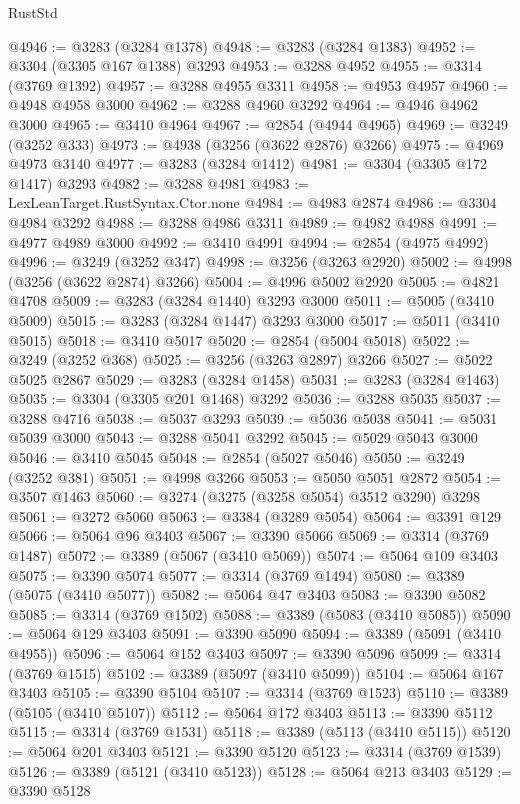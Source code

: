\begin{lexlean}{RustStd}
\begin{coremodule}
@4946 := @3283 (@3284 @1378)
@4948 := @3283 (@3284 @1383)
@4952 := @3304 (@3305 @167 @1388) @3293
@4953 := @3288 @4952
@4955 := @3314 (@3769 @1392)
@4957 := @3288 @4955 @3311
@4958 := @4953 @4957
@4960 := @4948 @4958 @3000
@4962 := @3288 @4960 @3292
@4964 := @4946 @4962 @3000
@4965 := @3410 @4964
@4967 := @2854 (@4944 @4965)
@4969 := @3249 (@3252 @333)
@4973 := @4938 (@3256 (@3622 @2876) @3266)
@4975 := @4969 @4973 @3140
@4977 := @3283 (@3284 @1412)
@4981 := @3304 (@3305 @172 @1417) @3293
@4982 := @3288 @4981
@4983 := LexLeanTarget.RustSyntax.Ctor.none
@4984 := @4983 @2874
@4986 := @3304 @4984 @3292
@4988 := @3288 @4986 @3311
@4989 := @4982 @4988
@4991 := @4977 @4989 @3000
@4992 := @3410 @4991
@4994 := @2854 (@4975 @4992)
@4996 := @3249 (@3252 @347)
@4998 := @3256 (@3263 @2920)
@5002 := @4998 (@3256 (@3622 @2874) @3266)
@5004 := @4996 @5002 @2920
@5005 := @4821 @4708
@5009 := @3283 (@3284 @1440) @3293 @3000
@5011 := @5005 (@3410 @5009)
@5015 := @3283 (@3284 @1447) @3293 @3000
@5017 := @5011 (@3410 @5015)
@5018 := @3410 @5017
@5020 := @2854 (@5004 @5018)
@5022 := @3249 (@3252 @368)
@5025 := @3256 (@3263 @2897) @3266
@5027 := @5022 @5025 @2867
@5029 := @3283 (@3284 @1458)
@5031 := @3283 (@3284 @1463)
@5035 := @3304 (@3305 @201 @1468) @3292
@5036 := @3288 @5035
@5037 := @3288 @4716
@5038 := @5037 @3293
@5039 := @5036 @5038
@5041 := @5031 @5039 @3000
@5043 := @3288 @5041 @3292
@5045 := @5029 @5043 @3000
@5046 := @3410 @5045
@5048 := @2854 (@5027 @5046)
@5050 := @3249 (@3252 @381)
@5051 := @4998 @3266
@5053 := @5050 @5051 @2872
@5054 := @3507 @1463
@5060 := @3274 (@3275 (@3258 @5054) @3512 @3290) @3298
@5061 := @3272 @5060
@5063 := @3384 (@3289 @5054)
@5064 := @3391 @129
@5066 := @5064 @96 @3403
@5067 := @3390 @5066
@5069 := @3314 (@3769 @1487)
@5072 := @3389 (@5067 (@3410 @5069))
@5074 := @5064 @109 @3403
@5075 := @3390 @5074
@5077 := @3314 (@3769 @1494)
@5080 := @3389 (@5075 (@3410 @5077))
@5082 := @5064 @47 @3403
@5083 := @3390 @5082
@5085 := @3314 (@3769 @1502)
@5088 := @3389 (@5083 (@3410 @5085))
@5090 := @5064 @129 @3403
@5091 := @3390 @5090
@5094 := @3389 (@5091 (@3410 @4955))
@5096 := @5064 @152 @3403
@5097 := @3390 @5096
@5099 := @3314 (@3769 @1515)
@5102 := @3389 (@5097 (@3410 @5099))
@5104 := @5064 @167 @3403
@5105 := @3390 @5104
@5107 := @3314 (@3769 @1523)
@5110 := @3389 (@5105 (@3410 @5107))
@5112 := @5064 @172 @3403
@5113 := @3390 @5112
@5115 := @3314 (@3769 @1531)
@5118 := @3389 (@5113 (@3410 @5115))
@5120 := @5064 @201 @3403
@5121 := @3390 @5120
@5123 := @3314 (@3769 @1539)
@5126 := @3389 (@5121 (@3410 @5123))
@5128 := @5064 @213 @3403
@5129 := @3390 @5128

\end{coremodule}
\end{lexlean}

